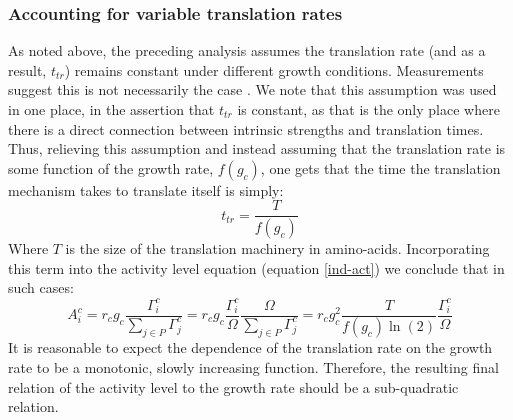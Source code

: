 \documentclass[a4page,notitlepage]{article}
\begin{document}
\subsubsection{Accounting for variable translation rates}
\label{nonconst-trans}
As noted above, the preceding analysis assumes the translation rate (and as a result, $t_{tr}$) remains constant under different growth conditions.
Measurements suggest this is not necessarily the case \cite{Liang2000}.
We note that this assumption was used in one place, in the assertion that $t_{tr}$ is constant, as that is the only place where there is a direct connection between intrinsic strengths and translation times.
Thus, relieving this assumption and instead assuming that the translation rate is some function of the growth rate, $f(g_c)$, one gets that the time the translation mechanism takes to translate itself is simply:
\begin{equation}
t_{tr}=\frac{T}{f(g_c)}
\end{equation}
Where $T$ is the size of the translation machinery in amino-acids.
Incorporating this term into the activity level equation (equation \ref{ind-act}) we conclude that in such cases:
\begin{equation}
A^c_i=r_c g_c \frac{\Gamma^c_i}{\sum_{j\in P}\Gamma^c_j}=r_c g_c \frac{\Gamma^c_i}{\Omega}\frac{\Omega}{\sum_{j\in P}\Gamma^c_j}=r_c g_c^2\frac{T}{f(g_c)\ln(2)}\frac{\Gamma^c_i}{\Omega}
\end{equation}
It is reasonable to expect the dependence of the translation rate on the growth rate to be a monotonic, slowly increasing function.
Therefore, the resulting final relation of the activity level to the growth rate should be a sub-quadratic relation.
\end{document}

